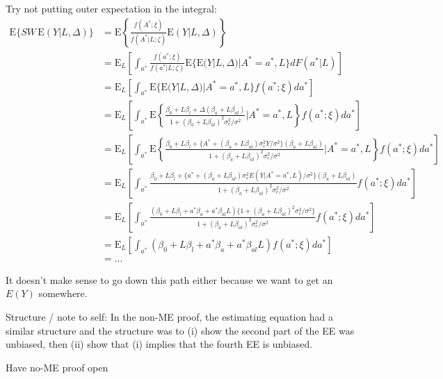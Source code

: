 \documentclass[12pt]{article}
\begin{document}
Try not putting outer expectation in the integral:
\begin{align*}
\text{E} \{ SW \, \text{E}(Y|L, \Delta) \} &= \text{E} \left \{ \frac{f(A^*;\xi)}{f(A^*|L;\zeta)} \text{E}(Y|L, \Delta) \right \} \\
&= \text{E}_L \left [ \int_{a^*} \frac{f(a^*;\xi)}{f(a^*|L;\zeta)} \text{E}\{\text{E}(Y|L, \Delta)|A^*=a^*,L\} dF(a^*|L) \right ]\\
&= \text{E}_L \left [ \int_{a^*}  \text{E}\{\text{E}(Y|L, \Delta)|A^*=a^*,L\} f(a^*;\xi) da^* \right ] \\
&= \text{E}_L \left [ \int_{a^*}  \text{E} \left \{
\frac{\beta_{0} + L \beta_{l} + \Delta (\beta_{a} + L \beta_{al})}{1 + (\beta_{a} + L \beta_{al})^2 \sigma_{e}^2  / \sigma^{2}}
\bigg| A^*=a^*, L \right \} f(a^*;\xi) da^* \right ] \\
&= \text{E}_L \left [ \int_{a^*}  \text{E} \left \{
\frac{\beta_{0} + L \beta_{l} + \{ A^{*} + (\beta_{a} + L \beta_{al}) \sigma^{2}_{e}Y / \sigma^{2} \} (\beta_{a} + L \beta_{al})}{1 + (\beta_{a} + L \beta_{al})^2 \sigma_{e}^2  / \sigma^{2}}
\bigg| A^*=a^*, L \right \} f(a^*;\xi) da^* \right ] \\
&= \text{E}_L \left [ \int_{a^*}
\frac{\beta_{0} + L \beta_{l} + \{ a^{*} + (\beta_{a} + L \beta_{al}) \sigma^{2}_{e}E(Y | A^{*} = a^{*}, L) / \sigma^{2} \} (\beta_{a} + L \beta_{al})}{1 + (\beta_{a} + L \beta_{al})^2 \sigma_{e}^2  / \sigma^{2}} f(a^*;\xi) da^* \right ] \\
&= \text{E}_L \left [ \int_{a^*}
\frac{(\beta_{0} + L \beta_{l} + a^{*} \beta_{a} + a^{*}\beta_{al}L) \{ 1 + (\beta_{a} + L \beta_{al})^2 \sigma_{e}^2  / \sigma^{2} \}}{1 + (\beta_{a} + L \beta_{al})^2 \sigma_{e}^2  / \sigma^{2}} f(a^*;\xi) da^* \right ] \\
&= \text{E}_L \left [ \int_{a^*}
(\beta_{0} + L \beta_{l} + a^{*} \beta_{a} + a^{*}\beta_{al}L) f(a^*;\xi) da^* \right ] \\
&= ...
\end{align*}

It doesn't make sense to go down this path either because we want to get an $E(Y)$ somewhere.

Structure / note to self: In the non-ME proof, the estimating equation had a similar structure and the structure was to (i) show the second part of the EE was unbiased, then (ii) show that (i) implies that the fourth EE is unbiased.

Have no-ME proof open
\end{document}

